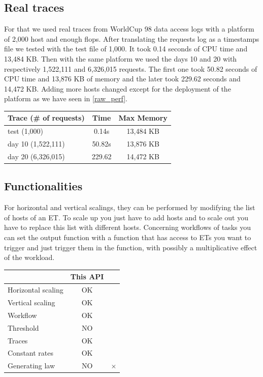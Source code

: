 \documentclass[a4paper, onecolumn]{article}
\begin{document}
    
       
  \subsection{Real traces}
    For that we used real traces from WorldCup 98 data access logs \cite{wc98}
    with a platform of 2,000 host and enough flops. After translating the
    requests log as a timestamps file we tested with the test file of 1,000. It
    took 0.14 seconds of CPU time and 13,484 KB. Then with the same platform we
    used the days 10 and 20 with respectively 1,522,111 and 6,326,015 requests.
    The first one took 50.82 seconds of CPU time and 13,876 KB of memory and
    the later took 229.62 seconds and 14,472 KB. Adding more hosts changed 
    except for the deployment of the platform as we have seen in \ref{raw_perf}.
    
    \begin{center}
     	\begin{tabular}{| l | c | c |}
     		\hline
     		Trace (\# of requests) & Time & Max Memory\\ 
     		\hline
     		test (1,000) & 0.14s & 13,484 KB\\
	        \hline
	        day 10 (1,522,111) & 50.82s & 13,876 KB\\
	        \hline
	        day 20 (6,326,015) & 229.62 & 14,472 KB\\
     		\hline
     	\end{tabular}
    \end{center}
  
  \subsection{Functionalities}
   For horizontal and vertical scalings, they can be performed by modifying the 
   list of hosts of an ET. To scale up you just have to add hosts and to scale 
   out you have to replace this list with different hosts. Concerning workflows 
   of tasks you can set the output function with a function that has access to 
   ETs you want to trigger and just trigger them in the function, with possibly 
   a multiplicative effect of the workload.
   
   \begin{center}
   	\begin{tabular}{| l | c | c |}
   		\hline
   		& This API & \cite{vasic2012dejavu}\\ 
   		\hline
   		Horizontal scaling & OK & \checkmark\\
   		\hline
   		Vertical scaling & OK & \checkmark\\
   		\hline
   		Workflow & OK & \\
   		\hline
   		Threshold & NO & \\
   		\hline
   		Traces & OK & \\
   		\hline
   		Constant rates & OK & \\
   		\hline
   		Generating law & NO & $\times$ \\
   		\hline
   	\end{tabular}
   \end{center}
  
\end{document}
